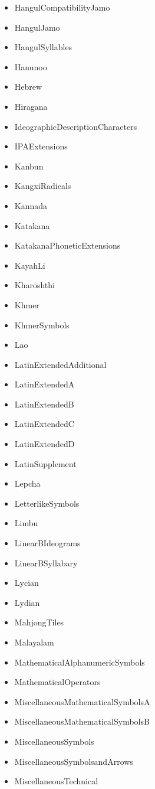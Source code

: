 ﻿\documentclass{article}
\newenvironment{itemlist}{%
  \begin{itemize}
	\setlength{\itemsep}{0pt}
	\setlength{\parsep}{0pt}
	\setlength{\topsep}{0pt}
	\setlength{\partopsep}{0pt}
	\setlength{\parskip}{0pt}
	\setlength{\labelsep}{5pt}}%
{
  \end{itemize}}
\begin{document}
\begin{multicols}{2}
\begin{itemlist}
				\item HangulCompatibilityJamo
				\item HangulJamo
				\item HangulSyllables
				\item Hanunoo
				\item Hebrew
				\item Hiragana
				\item IdeographicDescriptionCharacters
				\item IPAExtensions
				\item Kanbun
				\item KangxiRadicals
				\item Kannada
				\item Katakana
				\item KatakanaPhoneticExtensions
				\item KayahLi
				\item Kharoshthi
				\item Khmer
				\item KhmerSymbols
				\item Lao
				\item LatinExtendedAdditional
				\item LatinExtendedA
				\item LatinExtendedB
				\item LatinExtendedC
				\item LatinExtendedD
				\item LatinSupplement
				\item Lepcha
				\item LetterlikeSymbols
				\item Limbu
				\item LinearBIdeograms
				\item LinearBSyllabary
				\item Lycian
				\item Lydian
				\item MahjongTiles
				\item Malayalam
				\item MathematicalAlphanumericSymbols
				\item MathematicalOperators
				\item MiscellaneousMathematicalSymbolsA
				\item MiscellaneousMathematicalSymbolsB
				\item MiscellaneousSymbols
				\item MiscellaneousSymbolsandArrows
				\item MiscellaneousTechnical

\end{itemlist}
\end{multicols}
\end{document}
